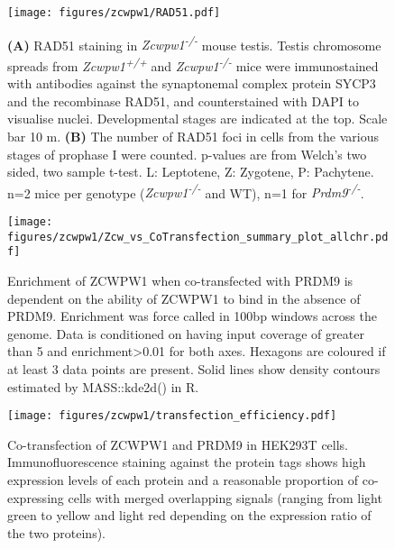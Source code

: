 \begin{figure}[H]
	\centering
	\texttt{[image: figures/zcwpw1/RAD51.pdf]}
	\caption[RAD51 Counts]{
		\textbf{(A)} RAD51 staining in \textit{Zcwpw1\textsuperscript{-/-}} mouse testis.
			Testis chromosome spreads from \textit{Zcwpw1\textsuperscript{+/+}} and \textit{Zcwpw1\textsuperscript{-/-}} mice were immunostained with antibodies against the synaptonemal complex protein SYCP3 and the recombinase RAD51, and counterstained with DAPI to visualise nuclei.
			Developmental stages are indicated at the top.
			Scale bar 10 \textmu m.
		\textbf{(B)} The number of RAD51 foci in cells from the various stages of prophase I were counted.
			p-values are from Welch’s two sided, two sample t-test.
			L: Leptotene, Z: Zygotene, P: Pachytene.
			n=2 mice per genotype (\textit{Zcwpw1\textsuperscript{-/-}} and WT), n=1 for \textit{Prdm9\textsuperscript{-/-}}.
	}
	\label{fig:Rad51}
\end{figure}


\begin{figure}[H]
	\centering
	\texttt{[image: figures/zcwpw1/Zcw\_vs\_CoTransfection\_summary\_plot\_allchr.pdf]}
	\caption[Zcwpw1 alone vs Co-transfection]{
		Enrichment of ZCWPW1 when co-transfected with PRDM9 is dependent on the ability of ZCWPW1 to bind in the absence of PRDM9.
		Enrichment was force called in 100bp windows across the genome.
		Data is conditioned on having input coverage of greater than 5 and enrichment>0.01 for both axes.
		Hexagons are coloured if at least 3 data points are present.
		Solid lines show density contours estimated by MASS::kde2d() in R.
	}
	\label{fig:Zcw_vs_cotransfection}
\end{figure}


\begin{figure}[H]
	\centering
	\texttt{[image: figures/zcwpw1/transfection\_efficiency.pdf]}
	\caption[Transfection Efficiency]{
		Co-transfection of ZCWPW1 and PRDM9 in HEK293T cells.
		Immunofluorescence staining against the protein tags shows high expression levels of each protein and a reasonable proportion of co-expressing cells with merged overlapping signals (ranging from light green to yellow and light red depending on the expression ratio of the two proteins).
	}
	\label{fig:transfection_efficiency}
\end{figure}


